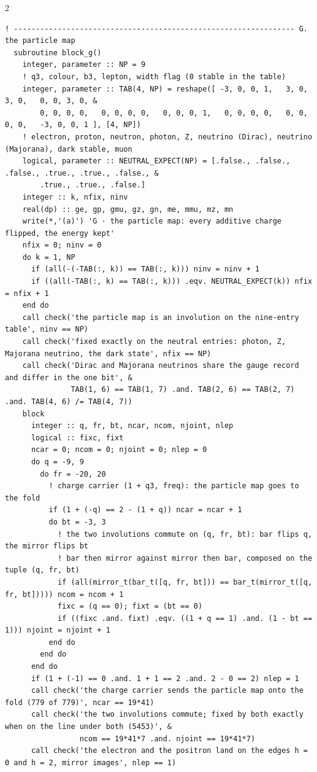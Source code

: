 \documentclass[10pt]{article}
\begin{document}
\begin{multicols}{2}
\begin{Verbatim}[fontsize=\fontsize{6.2}{7.2}\selectfont,breaklines,breakanywhere,breaksymbolleft={}]
  ! ---------------------------------------------------------------- G. the particle map
  subroutine block_g()
    integer, parameter :: NP = 9
    ! q3, colour, b3, lepton, width flag (0 stable in the table)
    integer, parameter :: TAB(4, NP) = reshape([ -3, 0, 0, 1,   3, 0, 3, 0,   0, 0, 3, 0, &
        0, 0, 0, 0,   0, 0, 0, 0,   0, 0, 0, 1,   0, 0, 0, 0,   0, 0, 0, 0,   -3, 0, 0, 1 ], [4, NP])
    ! electron, proton, neutron, photon, Z, neutrino (Dirac), neutrino (Majorana), dark stable, muon
    logical, parameter :: NEUTRAL_EXPECT(NP) = [.false., .false., .false., .true., .true., .false., &
        .true., .true., .false.]
    integer :: k, nfix, ninv
    real(dp) :: ge, gp, gmu, gz, gn, me, mmu, mz, mn
    write(*,'(a)') 'G · the particle map: every additive charge flipped, the energy kept'
    nfix = 0; ninv = 0
    do k = 1, NP
      if (all(-(-TAB(:, k)) == TAB(:, k))) ninv = ninv + 1
      if ((all(-TAB(:, k) == TAB(:, k))) .eqv. NEUTRAL_EXPECT(k)) nfix = nfix + 1
    end do
    call check('the particle map is an involution on the nine-entry table', ninv == NP)
    call check('fixed exactly on the neutral entries: photon, Z, Majorana neutrino, the dark state', nfix == NP)
    call check('Dirac and Majorana neutrinos share the gauge record and differ in the one bit', &
               TAB(1, 6) == TAB(1, 7) .and. TAB(2, 6) == TAB(2, 7) .and. TAB(4, 6) /= TAB(4, 7))
    block
      integer :: q, fr, bt, ncar, ncom, njoint, nlep
      logical :: fixc, fixt
      ncar = 0; ncom = 0; njoint = 0; nlep = 0
      do q = -9, 9
        do fr = -20, 20
          ! charge carrier (1 + q3, freq): the particle map goes to the fold
          if (1 + (-q) == 2 - (1 + q)) ncar = ncar + 1
          do bt = -3, 3
            ! the two involutions commute on (q, fr, bt): bar flips q, the mirror flips bt
            ! bar then mirror against mirror then bar, composed on the tuple (q, fr, bt)
            if (all(mirror_t(bar_t([q, fr, bt])) == bar_t(mirror_t([q, fr, bt])))) ncom = ncom + 1
            fixc = (q == 0); fixt = (bt == 0)
            if ((fixc .and. fixt) .eqv. ((1 + q == 1) .and. (1 - bt == 1))) njoint = njoint + 1
          end do
        end do
      end do
      if (1 + (-1) == 0 .and. 1 + 1 == 2 .and. 2 - 0 == 2) nlep = 1
      call check('the charge carrier sends the particle map onto the fold (779 of 779)', ncar == 19*41)
      call check('the two involutions commute; fixed by both exactly when on the line under both (5453)', &
                 ncom == 19*41*7 .and. njoint == 19*41*7)
      call check('the electron and the positron land on the edges h = 0 and h = 2, mirror images', nlep == 1)

\end{Verbatim}
\end{multicols}
\end{document}
